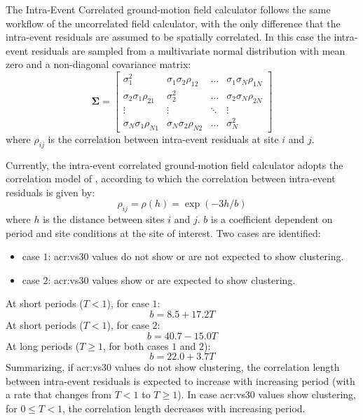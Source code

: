The Intra-Event Correlated ground-motion field calculator follows the same 
workflow of the uncorrelated field calculator, with the only difference that 
the intra-event residuals are assumed to be spatially correlated. 
%
In this case the intra-event residuals are sampled from a multivariate 
normal distribution with mean zero and a non-diagonal covariance matrix:
\begin{equation}
\bm{\Sigma}=
\begin{bmatrix}
\sigma^{2}_{1} &  \sigma_{1}\sigma_{2}\rho_{12}  & \ldots &  \sigma_{1}\sigma_{N}\rho_{1N}\\
\sigma_{2}\sigma_{1}\rho_{21}  &  \sigma^{2}_{2} & \ldots &  \sigma_{2}\sigma_{N}\rho_{2N}\\
\vdots & \vdots & \ddots & \vdots\\
\sigma_{N}\sigma_{1}\rho_{N1}  &   \sigma_{N}\sigma_{2}\rho_{N2}       &\ldots & \sigma^{2}_{N}
\end{bmatrix}
\end{equation}
where $\rho_{ij}$ is the correlation between intra-event residuals at site 
$i$ and $j$.

Currently, the intra-event correlated ground-motion field calculator adopts 
the correlation model of \citet{jayaram2009}, according to which the 
correlation between intra-event residuals is given by:
 \begin{equation}
 \rho_{ij} = \rho(h) = \exp(-3h/b)
 \end{equation}
 where $h$ is the distance between sites $i$ and $j$. $b$ is a coefficient 
 dependent on period and site conditions at the site of interest. Two cases 
 are identified:
 \begin{itemize}
 \item case $1$: \gls{acr:vs30} values do not show or are not expected to show 
 clustering.
 \item case $2$: \gls{acr:vs30} values show or are expected to show 
 clustering.
 \end{itemize}
At short periods ($T<1$), for case $1$:
\begin{equation}
b = 8.5 + 17.2T
\end{equation}
At short periods ($T<1$), for case $2$:
\begin{equation}
b = 40.7 - 15.0T
\end{equation}
At long periods ($T\geq1$, for both cases $1$ and $2$):
\begin{equation}
b = 22.0 + 3.7T
\end{equation}
Summarizing, if \gls{acr:vs30} values do not show clustering, the 
correlation length between intra-event residuals is expected to 
increase with increasing period (with a rate that changes from 
$T<1$ to $T\geq1$). 
%
In case \gls{acr:vs30} values show clustering, for  $0\leq T<1$, the 
correlation length decreases with increasing period.

